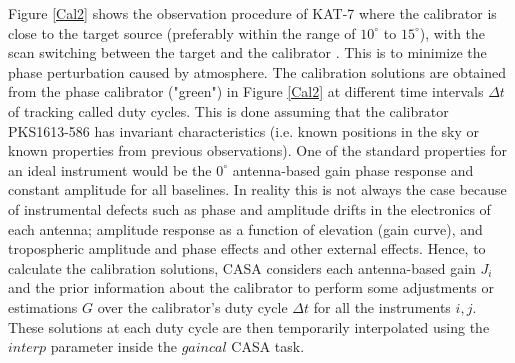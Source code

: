 Figure \ref{Cal2} shows the observation procedure of KAT-7 where the calibrator is close to the target source (preferably within the range of $10^{\circ}$ to $15^{\circ}$), with the scan switching  between  the target and the calibrator \citep{taylor1999synthesis}. This is to minimize the phase perturbation caused by atmosphere. The calibration solutions are obtained from the phase calibrator ("green") in Figure \ref{Cal2} at different time intervals $\Delta t$ of tracking called duty cycles. This is done assuming that the calibrator PKS1613-586 has invariant characteristics (i.e. known positions in the sky or known properties from previous observations). One of the standard properties for an ideal instrument would be the $0^{\circ}$ antenna-based gain phase response and constant amplitude for all baselines. In reality this is not always the case because of instrumental defects such as phase and amplitude drifts in the electronics of each antenna; amplitude response as a function of elevation (gain curve), and tropospheric amplitude and phase effects and other external effects. Hence, to calculate the calibration solutions, CASA considers each antenna-based gain $J_i$ and the prior information about the calibrator to perform some adjustments or estimations $G$ over the calibrator's duty cycle $\Delta t$ for all the instruments $i,j$. These solutions at each duty cycle are then temporarily interpolated using the $\textit{interp}$ parameter inside the $\textit{gaincal}$ CASA task. 

%
 
